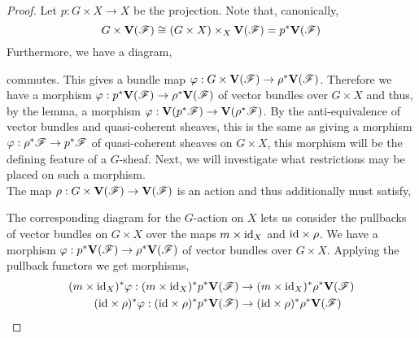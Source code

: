 \documentclass[12pt]{article}
\begin{document}
\begin{proof}
Let $p : G \times X \to X$ be the projection. Note that, canonically,
\[ G \times \mathbf{V}(\mathscr{F}) \cong (G \times X) \times_X \mathbf{V}(\mathscr{F}) = p^* \mathbf{V}(\mathscr{F}) \]
Furthermore, we have a diagram,
\begin{center}
\end{center}
commutes. This gives a bundle map $\varphi : G \times \mathbf{V}(\mathscr{F}) \to \rho^* \mathbf{V}(\mathscr{F})$. Therefore we have a morphism $\varphi : p^* \mathbf{V}(\mathscr{F}) \to \rho^* \mathbf{V}(\mathscr{F})$ of vector bundles over $G \times X$ and thus, by the lemma, a morphism $\varphi : \mathbf{V}(p^* \mathscr{F}) \to \mathbf{V}(\rho^* \mathscr{F})$. By the anti-equivalence of vector bundles and quasi-coherent sheaves, this is the same as giving a morphism $\varphi : \rho^* \mathscr{F} \to p^* \mathscr{F}$ of quasi-coherent sheaves on $G \times X$, this morphism will be the defining feature of a $G$-sheaf. Next, we will investigate what restrictions may be placed on such a morphism.
\bigskip\\
The map $\rho : G \times \mathbf{V}(\mathscr{F}) \to \mathbf{V}(\mathscr{F})$ is an action and thus additionally must satisfy,
\begin{center}
\end{center}
The corresponding diagram for the $G$-action on $X$ lets us consider the pullbacks of vector bundles on $G \times X$ over the maps $m \times \mathrm{id}_X$ and $\mathrm{id} \times \rho$. We have a morphism $\varphi : p^* \mathbf{V}(\mathscr{F}) \to \rho^* \mathbf{V}(\mathscr{F})$ of vector bundles over $G \times X$. Applying the pullback functors we get morphisms,
\begin{align*}
(m \times \id_X)^* \varphi : (m \times \id_X)^* p^* \V(\F) & \to (m \times \id_X)^* \rho^* \V(\F) 
\\
(\id \times \rho)^* \varphi : (\id \times \rho)^* p^* \V(\F) & \to (\id \times \rho)^* \rho^* \V(\F)

\end{align*}
\end{proof}
\end{document}

